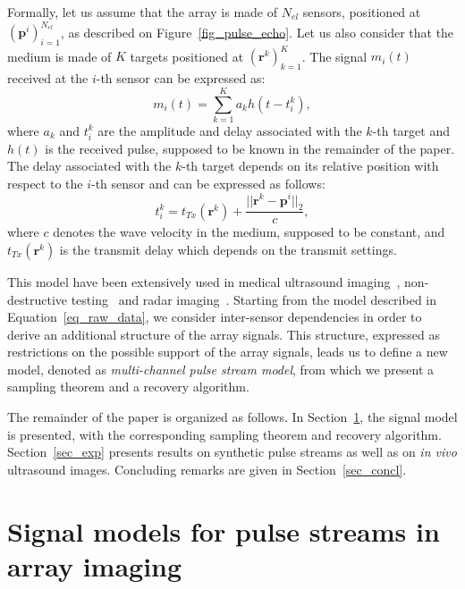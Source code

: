 \documentclass{article}
\newcommand{\vect}[1]{\bm{#1}}
\theoremstyle{definition}
\begin{document}
Formally, let us assume that the array is made of $N_{el}$ sensors, positioned at $\left(\vect{p}^i\right)_{i=1}^{N_{el}}$, as described on Figure~\ref{fig_pulse_echo}. 
Let us also consider that the medium is made of $K$ targets positioned at $\left(\vect{r}^k\right)_{k=1}^K$. The signal $m_{i} \left(t\right)$ received at the $i$-th sensor can be expressed as:
\begin{equation}
\label{eq_raw_data}
m_{i} \left(t\right) = \sum \limits_{k=1}^{K} a_k h\left(t - t_i^k\right), 
\end{equation}
where $a_k$ and $t_i^k$ are the amplitude and delay associated with the $k$-th target and $h\left(t\right)$ is the received pulse, supposed to be known in the remainder of the paper. 
The delay associated with the $k$-th target depends on its relative position with respect to the $i$-th sensor and can be expressed as follows:
\begin{equation}
\label{eq_usdelay}
t_i^k = t_{Tx}\left(\vect{r}^k\right) + \frac{||\vect{r}^k -  \vect{p}^i ||_2}{c},
\end{equation}
where $c$ denotes the wave velocity in the medium, supposed to be constant, and $t_{Tx}\left(\vect{r}^k\right)$ is the transmit delay which depends on the transmit settings.

This model have been extensively used in medical ultrasound imaging~\cite{Chernyakova2014, Tur_TSP_2012, Bendory_TSP_2016}, non-destructive testing~\cite{Carcreff_UFFC_2014} and radar imaging~\cite{Ilan_TSP_2014, Baraniuk2007}. 
Starting from the model described in Equation~\eqref{eq_raw_data}, we consider inter-sensor dependencies in order to derive an additional structure of the array signals. 
This structure, expressed as restrictions on the possible support of the array signals, leads us to define a new model, denoted as \textit{multi-channel pulse stream model}, from which we present a sampling theorem and a recovery algorithm.

The remainder of the paper is organized as follows. 
In Section~\ref{sec_pulsestreams_US}, the signal model is presented, with the corresponding sampling theorem and recovery algorithm. 
Section~\ref{sec_exp} presents results on synthetic pulse streams as well as on \textit{in vivo} ultrasound images. Concluding remarks are given in Section~\ref{sec_concl}.
\section{Signal models for pulse streams in array imaging}
\label{sec_pulsestreams_US}
\end{document}

